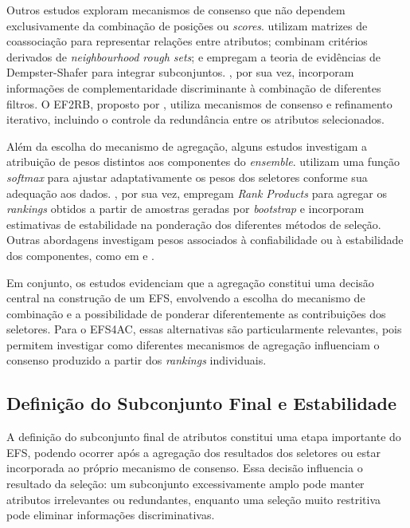 Outros estudos exploram mecanismos de consenso que não dependem exclusivamente da combinação de posições ou \textit{scores}.  utilizam matrizes de coassociação para representar relações entre atributos;  combinam critérios derivados de \textit{neighbourhood rough sets}; e  empregam a teoria de evidências de Dempster-Shafer para integrar subconjuntos. , por sua vez, incorporam informações de complementaridade discriminante à combinação de diferentes filtros. O EF2RB, proposto por , utiliza mecanismos de consenso e refinamento iterativo, incluindo o controle da redundância entre os atributos selecionados.

Além da escolha do mecanismo de agregação, alguns estudos investigam a atribuição de pesos distintos aos componentes do \textit{ensemble}.  utilizam uma função \textit{softmax} para ajustar adaptativamente os pesos dos seletores conforme sua adequação aos dados. , por sua vez, empregam \textit{Rank Products} para agregar os \textit{rankings} obtidos a partir de amostras geradas por \textit{bootstrap} e incorporam estimativas de estabilidade na ponderação dos diferentes métodos de seleção. Outras abordagens investigam pesos associados à confiabilidade ou à estabilidade dos componentes, como em  e .

Em conjunto, os estudos evidenciam que a agregação constitui uma decisão central na construção de um EFS, envolvendo a escolha do mecanismo de combinação e a possibilidade de ponderar diferentemente as contribuições dos seletores. Para o EFS4AC, essas alternativas são particularmente relevantes, pois permitem investigar como diferentes mecanismos de agregação influenciam o consenso produzido a partir dos \textit{rankings} individuais.

\subsection{Definição do Subconjunto Final e Estabilidade}
\label{subsec:efs-estabilidade-corte}

A definição do subconjunto final de atributos constitui uma etapa importante do EFS, podendo ocorrer após a agregação dos resultados dos seletores ou estar incorporada ao próprio mecanismo de consenso. Essa decisão influencia o resultado da seleção: um subconjunto excessivamente amplo pode manter atributos irrelevantes ou redundantes, enquanto uma seleção muito restritiva pode eliminar informações discriminativas.

